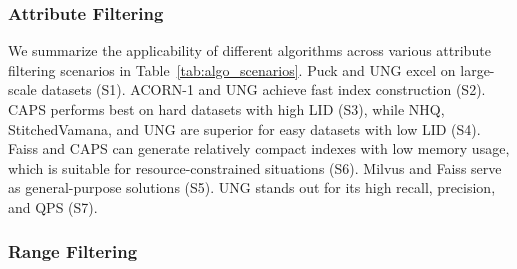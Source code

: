 \documentclass[sigconf, nonacm]{acmart}
\begin{document}
	\subsubsection{\textbf{Attribute Filtering}}
	
	
	\begin{table}[t]
		\centering
		\setlength{\abovecaptionskip}{0.05cm}
		\caption{Algorithm Recommendation per Scenario}
		\label{tab:algo_scenarios}
		
	\end{table}
	
	
	We summarize the applicability of different algorithms across various attribute filtering scenarios in Table~\ref{tab:algo_scenarios}.
	Puck and UNG excel on large-scale datasets (S1). ACORN-1 and UNG achieve fast index construction (S2). CAPS performs best on hard datasets with high LID (S3), while NHQ, StitchedVamana, and UNG are superior for easy datasets with low LID (S4). Faiss and CAPS can generate relatively compact indexes with low memory usage, which is suitable for resource-constrained situations (S6). Milvus and Faiss serve as general-purpose solutions (S5). UNG stands out for its high recall, precision, and QPS (S7).
	
	\subsubsection{\textbf{Range Filtering}}
	
\end{document}

